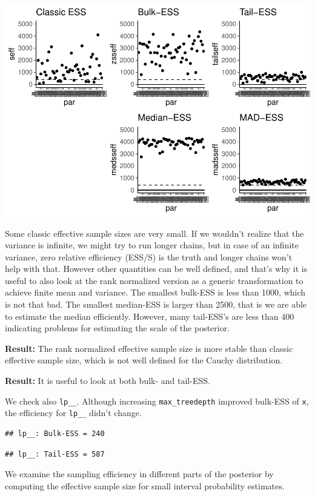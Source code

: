 \documentclass[american,]{article}
\begin{document}
\includegraphics{graphics/ess-fit-nom-td20-1.pdf}

Some classic effective sample sizes are very small. If we wouldn't
realize that the variance is infinite, we might try to run longer
chains, but in case of an infinite variance, zero relative efficiency
(ESS/S) is the truth and longer chains won't help with that. However
other quantities can be well defined, and that's why it is useful to
also look at the rank normalized version as a generic transformation to
achieve finite mean and variance. The smallest bulk-ESS is less than
1000, which is not that bad. The smallest median-ESS is larger than
2500, that is we are able to estimate the median efficiently. However,
many tail-ESS's are less than 400 indicating problems for estimating the
scale of the posterior.

\textbf{Result:} The rank normalized effective sample size is more
stable than classic effective sample size, which is not well defined for
the Cauchy distribution.

\textbf{Result:} It is useful to look at both bulk- and tail-ESS.

We check also \texttt{lp\_\_}. Although increasing
\texttt{max\_treedepth} improved bulk-ESS of \texttt{x}, the efficiency
for \texttt{lp\_\_} didn't change.

\begin{verbatim}
## lp__: Bulk-ESS = 240
\end{verbatim}

\begin{verbatim}
## lp__: Tail-ESS = 587
\end{verbatim}

We examine the sampling efficiency in different parts of the posterior
by computing the effective sample size for small interval probability
estimates.
\end{document}
